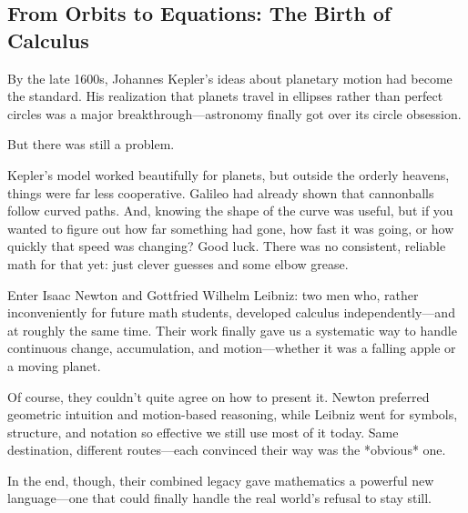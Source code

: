 \subsection{From Orbits to Equations: The Birth of Calculus}

By the late 1600s, Johannes Kepler’s ideas about planetary motion had become the standard. His realization that planets travel in ellipses rather than perfect circles was a major breakthrough—astronomy finally got over its circle obsession.

But there was still a problem.

Kepler’s model worked beautifully for planets, but outside the orderly heavens, things were far less cooperative. Galileo had already shown that cannonballs follow curved paths. And, knowing the shape of the curve was useful, but if you wanted to figure out how far something had gone, how fast it was going, or how quickly that speed was changing? Good luck. There was no consistent, reliable math for that yet: just clever guesses and some elbow grease.

Enter Isaac Newton and Gottfried Wilhelm Leibniz: two men who, rather inconveniently for future math students, developed calculus independently—and at roughly the same time. Their work finally gave us a systematic way to handle continuous change, accumulation, and motion—whether it was a falling apple or a moving planet.

Of course, they couldn’t quite agree on how to present it. Newton preferred geometric intuition and motion-based reasoning, while Leibniz went for symbols, structure, and notation so effective we still use most of it today. Same destination, different routes—each convinced their way was the *obvious* one.

In the end, though, their combined legacy gave mathematics a powerful new language—one that could finally handle the real world’s refusal to stay still. 
